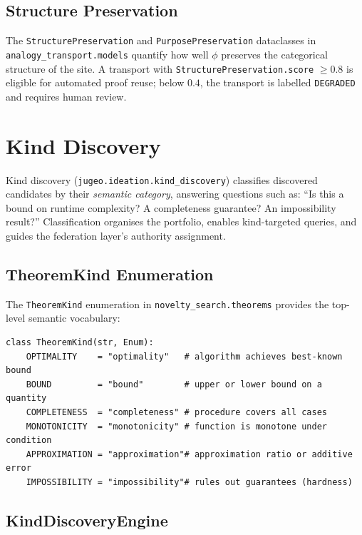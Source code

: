 \documentclass[11pt]{article}
\newcommand{\alg}[1]{\texttt{\small #1}}   %
\begin{document}
\subsection{Structure Preservation}

The \texttt{StructurePreservation} and \texttt{PurposePreservation}
dataclasses in \texttt{analogy\_transport.models} quantify how well
$\phi$ preserves the categorical structure of the site.  A transport
with \texttt{StructurePreservation.score} $\geq 0.8$ is eligible for
automated proof reuse; below $0.4$, the transport is labelled
\alg{DEGRADED} and requires human review.

\section{Kind Discovery}\label{sec:kinds}

Kind discovery (\texttt{jugeo.ideation.kind\_discovery}) classifies
discovered candidates by their \emph{semantic category}, answering
questions such as: ``Is this a bound on runtime complexity?  A
completeness guarantee?  An impossibility result?''  Classification
organises the portfolio, enables kind-targeted queries, and guides
the federation layer's authority assignment.

\subsection{TheoremKind Enumeration}

The \alg{TheoremKind} enumeration in \texttt{novelty\_search.theorems}
provides the top-level semantic vocabulary:

\begin{lstlisting}[style=jugeo-python, caption={Semantic theorem kinds.}]
class TheoremKind(str, Enum):
    OPTIMALITY    = "optimality"   # algorithm achieves best-known bound
    BOUND         = "bound"        # upper or lower bound on a quantity
    COMPLETENESS  = "completeness" # procedure covers all cases
    MONOTONICITY  = "monotonicity" # function is monotone under condition
    APPROXIMATION = "approximation"# approximation ratio or additive error
    IMPOSSIBILITY = "impossibility"# rules out guarantees (hardness)
\end{lstlisting}

\subsection{KindDiscoveryEngine}
\end{document}
